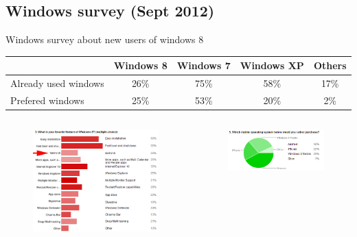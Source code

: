 \documentclass{beamer}
\begin{document}
\subsection{Windows survey (Sept 2012)}
\begin{frame}{Windows survey about new users of windows 8}

    \small
    \begin{center}
      \begin{tabular}{|l|c|c|c|c|}
        \hline
        & Windows 8 & Windows 7 & Windows XP & Others\\
        \hline
        Already used windows & 26\%	& 75\%	& 58\%	& 17\% \\
        Prefered windows	 & 25\%	& 53\%	& 20\%	& 2\% \\
        \hline
      \end{tabular}
    \end{center}
    \normalsize
    \begin{columns}[c]
      \begin{figure}
        \centering
        \includegraphics[scale=0.25]{windows8UI.jpg}
      \end{figure}
      \begin{figure}
        \centering
        \includegraphics[scale=0.25]{windows8Phone.png}


\end{figure}
\end{columns}
\end{frame}
\end{document}
